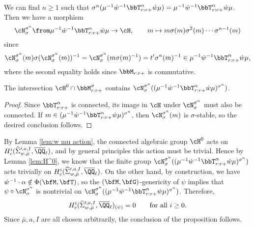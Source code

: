 We can find $n \geq 1$ such that $\sigma^{n}(\mu^{-1} \dot w^{-1} \bbT_{r:r+}^\alpha \dot w \mu) = \mu^{-1} \dot w^{-1} \bbT_{r:r+}^\alpha \dot w \mu$. Then we have a morphism
\begin{equation*}
  \cN_\sigma^{\sigma^n} \from \mu^{-1} \dot w^{-1} \bbT_{r:r+}^\alpha \dot w \mu \to \cH, \qquad m \mapsto m \sigma(m) \sigma^{2}(m) \cdots \sigma^{n-1}(m)
\end{equation*}
since
\begin{equation*}
  \cN_\sigma^{\sigma^n}(m) \sigma(\cN_\sigma^{\sigma^n}(m))^{-1} =  \cN_\sigma^{\sigma^n}(m\sigma(m)^{-1}) = t' \sigma^n(m)^{-1} \in \mu^{-1} \dot w^{-1} \bbT_{r:r+}^\alpha \dot w \mu,
\end{equation*}
where the second equality holds since $\bbM_{r:r+}$ is commutative. 

\begin{lemma}\label{lem:H^0}
  The intersection $\cH^0 \cap \bbM_{r:r+}^\sigma$ contains $\cN_\sigma^{\sigma^n}((\mu^{-1} \dot w^{-1} \bbT_{r:r+}^\alpha \dot w \mu)^{\sigma^n})$.
\end{lemma}

\begin{proof}
Since $\bbT_{r:r+}^\alpha$ is connected, its image in $\cH$ under $\cN_\sigma^{\sigma^n}$ must also be connected. If $m \in (\mu^{-1} \dot w^{-1} \bbT_{r:r+}^\alpha \dot w \mu)^{\sigma^n}$, then $\cN_\sigma^{\sigma^n}(m)$ is $\sigma$-stable, so the desired conclusion follows.
\end{proof}

By Lemma \ref{lem:w mu action}, the connected algebraic group $\cH^0$ acts on $H_c^i(\widehat \Sigma_{w,\bar\mu}^{\prime, a, I}, \overline \QQ_\ell)$, and by general principles this action must be trivial. Hence by Lemma \ref{lem:H^0}, we know that the finite group $\cN_\sigma^{\sigma^n}((\mu^{-1} \dot w^{-1} \bbT_{r:r+}^\alpha\dot w \mu)^{\sigma^n})$ acts trivially on $H_c^i(\widehat \Sigma_{w,\bar\mu}^{\prime, a, I}, \overline \QQ_\ell)$. On the other hand, by construction, we have $\dot w^{-1} \cdot \alpha \notin \Phi(\bfM,\bfT)$, so the $(\bfM,\bfG)$-genericity of $\psi$ implies that $\psi \circ \cN_\sigma^{\sigma^n}$ is nontrivial on $\cN_\sigma^{\sigma^n}((\mu^{-1} \dot w^{-1} \bbT_{r:r+}^\alpha \dot w \mu)^{\sigma^n})$. Therefore,
\begin{equation*}
  H_c^i(\widehat \Sigma_{w, \bar \mu}^{\prime, a, I}, \overline \QQ_\ell)_{(\psi)} = 0 \qquad \text{for all $i \geq 0$}.
\end{equation*} 
Since $\bar \mu, a, I$ are all chosen arbitrarily, the conclusion of the proposition follows.

